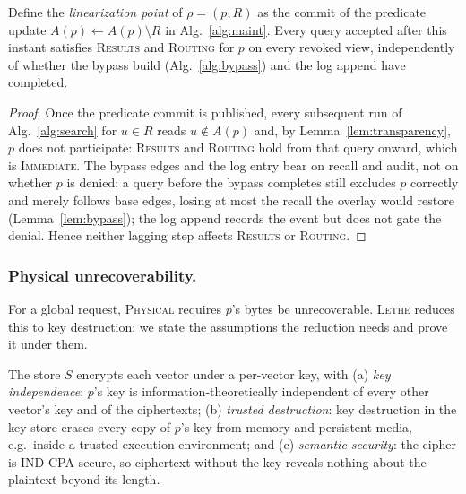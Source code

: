 \documentclass[sigconf, nonacm, review]{acmart}
\begin{document}
\begin{lemma}[Immediacy]
\label{lem:immediate}
Define the \emph{linearization point} of $\rho=(p,R)$ as the commit of the
predicate update $A(p)\gets A(p)\setminus R$ in Alg.~\ref{alg:maint}. Every
query accepted after this instant satisfies \textsc{Results} and
\textsc{Routing} for $p$ on every revoked view, independently of whether the
bypass build (Alg.~\ref{alg:bypass}) and the log append have completed.
\end{lemma}
\begin{proof}
Once the predicate commit is published, every subsequent run of
Alg.~\ref{alg:search} for $u\in R$ reads $u\notin A(p)$ and, by
Lemma~\ref{lem:transparency}, $p$ does not participate: \textsc{Results} and
\textsc{Routing} hold from that query onward, which is \textsc{Immediate}. The
bypass edges and the log entry bear on recall and audit, not on whether $p$ is
denied: a query before the bypass completes still excludes $p$ correctly and
merely follows base edges, losing at most the recall the overlay would
restore (Lemma~\ref{lem:bypass}); the log append records the event but does not
gate the denial. Hence neither lagging step affects \textsc{Results} or
\textsc{Routing}.
\end{proof}

\subsubsection{Physical unrecoverability.}
\label{app:correct-phys}
For a global request, \textsc{Physical} requires $p$'s bytes be unrecoverable.
\textsc{Lethe} reduces this to key destruction; we state the assumptions the
reduction needs and prove it under them.

\begin{assumption}
\label{ass:crypto}
The store $S$ encrypts each vector under a per-vector key, with (a)
\emph{key independence}: $p$'s key is information-theoretically independent of
every other vector's key and of the ciphertexts; (b) \emph{trusted
destruction}: key destruction in the key store erases every copy of $p$'s key
from memory and persistent media, e.g.\ inside a trusted execution
environment; and (c) \emph{semantic security}: the cipher is IND-CPA secure,
so ciphertext without the key reveals nothing about the plaintext beyond its
length.
\end{assumption}
\end{document}
